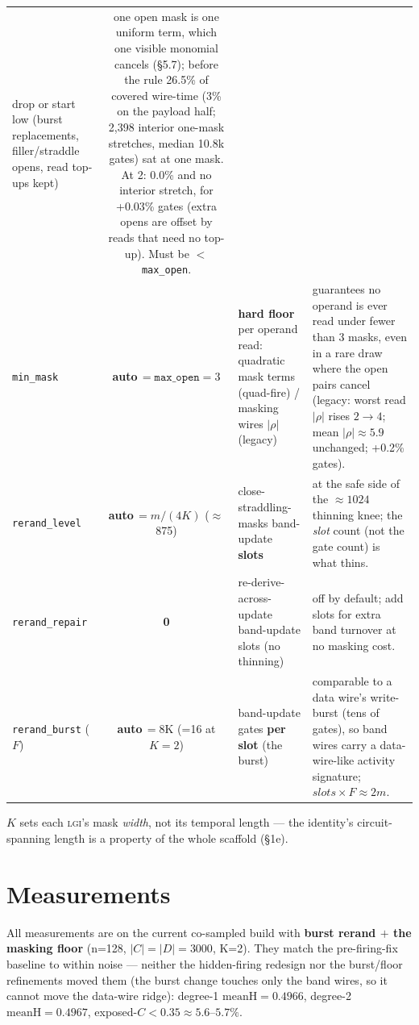\documentclass[11pt]{article}
\newcommand{\doc}[1]{\texttt{#1}}
\newcommand{\lgi}{\textsc{lgi}}
\begin{document}
\begin{table}[H]
\begin{tabular}{@{}lcL{3.4cm}L{5.0cm}@{}}
  drop or start low (burst replacements, filler/straddle opens, read top-ups kept) & one
  open mask is one uniform term, which one visible monomial cancels (\S5.7); before the
  rule 26.5\% of covered wire-time (3\% on the payload half; 2,398 interior one-mask
  stretches, median 10.8k gates) sat at one mask. At 2: 0.0\% and no interior stretch, for
  +0.03\% gates (extra opens are offset by reads that need no top-up). Must be
  $<$ \doc{max\_open}. \\
\addlinespace
\doc{min\_mask} & \textbf{auto\,$=\doc{max\_open}=3$} & \textbf{hard floor} per
  operand read: quadratic mask terms (quad-fire) / masking wires $|\rho|$ (legacy)
  & guarantees no operand is ever read under fewer than 3 masks, even in a rare draw
  where the open pairs cancel (legacy: worst read $|\rho|$ rises $2\to4$; mean
  $|\rho|\approx5.9$ unchanged; +0.2\% gates). \\
\addlinespace
\doc{rerand\_level} & \textbf{auto\,$=m/(4K)$} ($\approx$875) &
  close-straddling-masks band-update \textbf{slots} & at the safe side of the
  $\approx1024$ thinning knee; the \emph{slot} count (not the gate count) is what
  thins. \\
\addlinespace
\doc{rerand\_repair} & \textbf{0} & re-derive-across-update band-update slots (no
  thinning) & off by default; add slots for extra band turnover at no masking cost.
  \\
\addlinespace
\doc{rerand\_burst} ($F$) & \textbf{auto\,$=8\mathrm{K}$} (=16 at $K{=}2$) &
  band-update gates \textbf{per slot} (the burst) & comparable to a data wire's
  write-burst (tens of gates), so band wires carry a data-wire-like activity
  signature; $\mathit{slots}\times F\approx2m$. \\
\bottomrule
\end{tabular}
\end{table}
\noindent $K$ sets each \lgi's mask \emph{width}, not its temporal length --- the
identity's circuit-spanning length is a property of the whole scaffold (\S1e).

\section{Measurements}

All measurements are on the current co-sampled build with \textbf{burst rerand $+$
the masking floor} (n=128, $|C|=|D|=3000$, K=2). They match the pre-firing-fix
baseline to within noise --- neither the hidden-firing redesign nor the burst/floor
refinements moved them (the burst change touches only the band wires, so it cannot
move the data-wire ridge): degree-1 $\mathrm{meanH}=0.4966$, degree-2
$\mathrm{meanH}=0.4967$, exposed-$C<0.35\approx5.6$--$5.7\%$.
\end{document}
